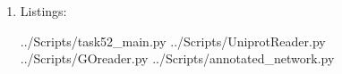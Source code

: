 \documentclass[10pt,a4paper]{article}
\begin{document}
\begin{enumerate}
	
	
	
	\newpage
	\item Listings:
	
	 {../Scripts/task52\string_main.py}
	\newpage
	 {../Scripts/UniprotReader.py}
	\newpage
	 {../Scripts/GOreader.py}
	\newpage
	 {../Scripts/annotated\string_network.py}
	
	
	
	
\end{enumerate}
\end{document}
